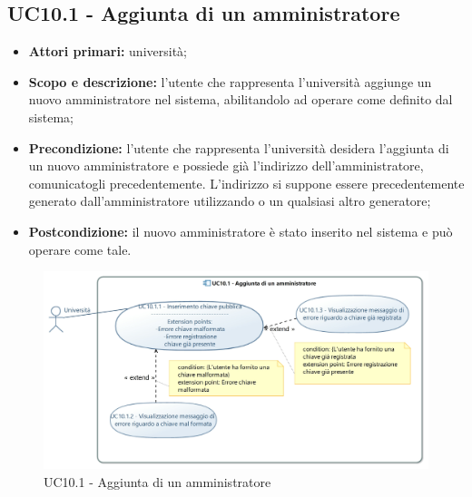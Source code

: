 \documentclass[AnalisiDeiRequisiti.tex]{subfiles}
\begin{document}
\subsection{UC10.1 - Aggiunta di un amministratore}
\begin{itemize}
	\item \textbf{Attori primari:} università;
	\item \textbf{Scopo e descrizione:} l'utente che rappresenta l'università aggiunge un nuovo amministratore nel sistema, abilitandolo ad operare come definito dal sistema;
	\item \textbf{Precondizione:} l'utente che rappresenta l'università desidera l'aggiunta di un nuovo amministratore e possiede già l'indirizzo dell'amministratore, comunicatogli precedentemente. L'indirizzo si suppone essere precedentemente generato dall'amministratore utilizzando  o un qualsiasi altro generatore; 
	\item \textbf{Postcondizione:} il nuovo amministratore è stato inserito nel sistema e può operare come tale.
\end{itemize}

\begin{figure}[H]
	\centering
	\includegraphics[width=1.0\linewidth]{UC10_1.jpg}
	\caption{UC10.1 - Aggiunta di un amministratore}
	\label{fig:UC10.1 - Aggiunta di un amministratore}
\end{figure}
\end{document}
